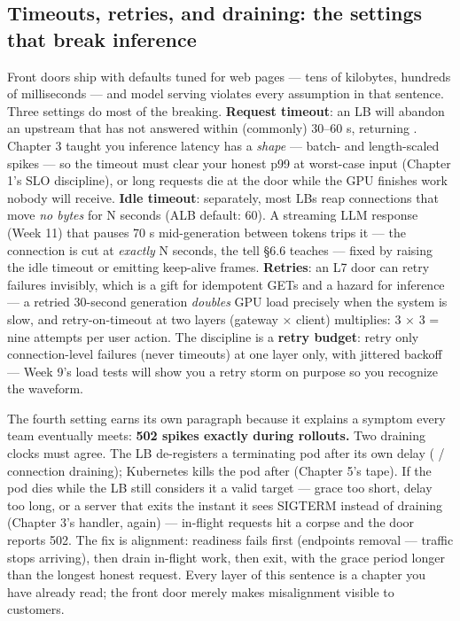 \subsection*{Timeouts, retries, and draining: the settings that break inference}

Front doors ship with defaults tuned for web pages — tens of kilobytes, hundreds of milliseconds — and model serving violates every assumption in that sentence. Three settings do most of the breaking. \textbf{Request timeout}: an LB will abandon an upstream that has not answered within (commonly) 30–60 s, returning . Chapter 3 taught you inference latency has a \textit{shape} — batch- and length-scaled spikes — so the timeout must clear your honest p99 at worst-case input (Chapter 1's SLO discipline), or long requests die at the door while the GPU finishes work nobody will receive. \textbf{Idle timeout}: separately, most LBs reap connections that move \textit{no bytes} for N seconds (ALB default: 60). A streaming LLM response (Week 11) that pauses 70 s mid-generation between tokens trips it — the connection is cut at \textit{exactly} N seconds, the tell §6.6 teaches — fixed by raising the idle timeout or emitting keep-alive frames. \textbf{Retries}: an L7 door can retry failures invisibly, which is a gift for idempotent GETs and a hazard for inference — a retried 30-second generation \textit{doubles} GPU load precisely when the system is slow, and retry-on-timeout at two layers (gateway × client) multiplies: 3 × 3 = nine attempts per user action. The discipline is a \textbf{retry budget}: retry only connection-level failures (never timeouts) at one layer only, with jittered backoff — Week 9's load tests will show you a retry storm on purpose so you recognize the waveform.

The fourth setting earns its own paragraph because it explains a symptom every team eventually meets: \textbf{502 spikes exactly during rollouts.} Two draining clocks must agree. The LB de-registers a terminating pod after its own delay ( / connection draining); Kubernetes kills the pod after  (Chapter 5's tape). If the pod dies while the LB still considers it a valid target — grace too short, delay too long, or a server that exits the instant it sees SIGTERM instead of draining (Chapter 3's handler, again) — in-flight requests hit a corpse and the door reports 502. The fix is alignment: readiness fails first (endpoints removal — traffic stops arriving), then drain in-flight work, then exit, with the grace period longer than the longest honest request. Every layer of this sentence is a chapter you have already read; the front door merely makes misalignment visible to customers.

